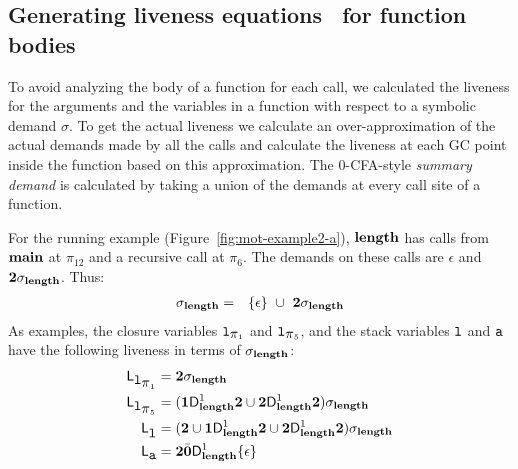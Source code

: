 \documentclass[9pt]{sigplanconf}
\begin{document}
\subsection{Generating liveness equations \Lv\  for function bodies}
\label{sec:bodylivenessbodies}

To  avoid analyzing  the body  of a  function for  each
call, we calculated the  liveness for the arguments and
the variables in a function  with respect to a symbolic
demand  $\sigma$.   To  get   the  actual  liveness  we
calculate an  over-approximation of the  actual demands
made by  all the  calls and  calculate the  liveness at
each  GC  point  inside  the  function  based  on  this
approximation.  The 0-CFA-style {\em summary demand} is
calculated by  taking a union  of the demands  at every
call site of a function.



For  the  running  example (Figure~\ref{fig:mot-example2-a}),  $\mathbf{length}$  has  calls  from  $\mathbf{main}$  at
$\pi_{12}$ and a recursive call at $\pi_6$. The demands on these calls
are $\epsilon$ and ${\mathbf{2}}\sigma_{\mathit{\mathbf{length}}}$. Thus:
\begin{eqnarray*}
\sigma_{\mathbf{length}}    &=&
 \{\epsilon\}  ~\cup~{{\mathbf{2}}\sigma_{\mathit{\mathbf{length}}}}
\end{eqnarray*}
As examples, the closure variables $\mbox{\tt l}_{\mbox{$\pi$}_1}$ and $\mbox{\tt l}_{\mbox{$\pi$}_5}$, and the
stack variables $\mbox{\tt l}$ and $\mbox{\tt a}$ have the following liveness in terms
of  $\sigma_{\mathbf{length}}$:
\begin{align*}
  \mathsf{L}_{\mbox{\tt l}_{\mbox{$\pi$}_1}} &= {\mathbf{2}}\sigma_{\mathit{\mathbf{length}}} \\
  \mathsf{L}_{\mbox{\tt l}_{\mbox{$\pi$}_5}} &=  (\mathbf{1}\mathsf{D}_{\mathit {\mathbf{length}}}^{1}{{\mathbf{2}}} \cup
  {\mathbf{2}}\mathsf{D}_{\mathit {\mathbf{length}}}^{1}{{\mathbf{2}}}) \sigma_{\mathit{\mathbf{length}}} \\
  \mathsf{L}_{{\mbox{\tt l}}}^{} &= ({\mathbf{2}} \cup \mathbf{1}\mathsf{D}_{\mathit {\mathbf{length}}}^{1}{\mathbf{2}}
  \cup {\mathbf{2}}\mathsf{D}_{\mathit {\mathbf{length}}}^{1}{{\mathbf{2}}})\sigma_{\mathit{\mathbf{length}}} \\
  \mathsf{L}_{{\mbox{\tt a}}}^{} &= {\mathbf{2}} \bar{\mathbf{0}} \mathsf{D}_{\mathit {\mathbf{length}}}^{1}\{\epsilon\}
\end{align*}
\end{document}
